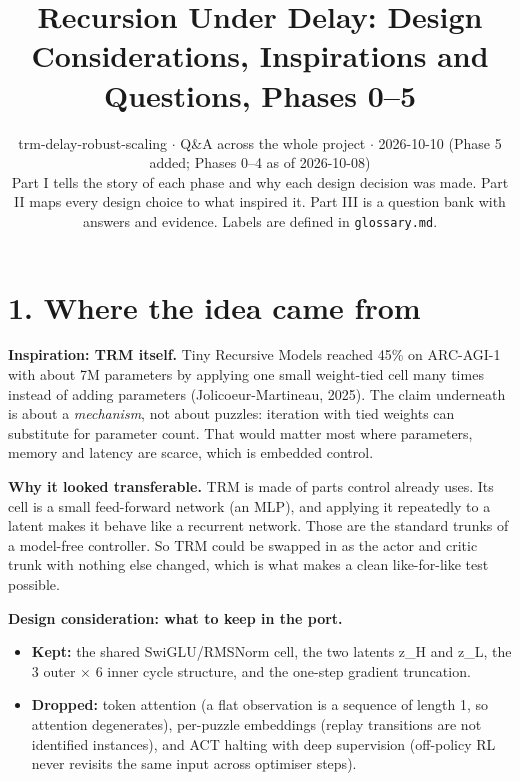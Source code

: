\documentclass[11pt]{article}
\title{Recursion Under Delay: Design Considerations, Inspirations and Questions, Phases 0--5}
\author{}
\date{trm-delay-robust-scaling $\cdot$ Q\&A across the whole project $\cdot$ 2026-10-10 (Phase 5 added; Phases 0--4 as of 2026-10-08)\\[2pt]Part I tells the story of each phase and why each design decision was made. Part II maps every design choice to what inspired it. Part III is a question bank with answers and evidence. Labels are defined in \texttt{glossary.md}.}
\begin{document}
\maketitle
\tableofcontents
\clearpage



\medskip{}



\section*{1. Where the idea came from}



\textbf{Inspiration: TRM itself.} Tiny Recursive Models reached 45\% on ARC-AGI-1 with about 7M parameters by applying one small weight-tied cell many times instead of adding parameters (Jolicoeur-Martineau, 2025). The claim underneath is about a \emph{mechanism}, not about puzzles: iteration with tied weights can substitute for parameter count. That would matter most where parameters, memory and latency are scarce, which is embedded control.



\textbf{Why it looked transferable.} TRM is made of parts control already uses. Its cell is a small feed-forward network (an MLP), and applying it repeatedly to a latent makes it behave like a recurrent network. Those are the standard trunks of a model-free controller. So TRM could be swapped in as the actor and critic trunk with nothing else changed, which is what makes a clean like-for-like test possible.



\textbf{Design consideration: what to keep in the port.}

\begin{itemize}
\item \textbf{Kept:} the shared SwiGLU/RMSNorm cell, the two latents z\_H and z\_L, the 3 outer $\times$ 6 inner cycle structure, and the one-step gradient truncation.
\item \textbf{Dropped:} token attention (a flat observation is a sequence of length 1, so attention degenerates), per-puzzle embeddings (replay transitions are not identified instances), and ACT halting with deep supervision (off-policy RL never revisits the same input across optimiser steps).
\end{itemize}
\end{document}
